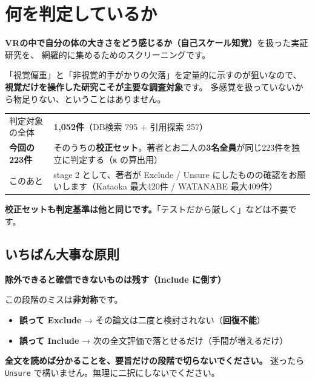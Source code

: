 \documentclass[a4paper]{ltjsarticle}
\newcommand{\keybox}[1]{%
  \par\medskip
  \noindent\colorbox{soft}{%
    \begin{minipage}{\dimexpr\linewidth-2\fboxsep\relax}
      \vspace{2pt}\centering\bfseries\large #1\vspace{4pt}
    \end{minipage}}%
  \par\medskip}
\newcommand{\rsn}[1]{\texttt{\small #1}}
\begin{document}
\section{何を判定しているか}

\textbf{VRの中で自分の体の大きさをどう感じるか（自己スケール知覚）}を扱った実証研究を、
網羅的に集めるためのスクリーニングです。

\medskip
\noindent
「視覚偏重」と「非視覚的手がかりの欠落」を定量的に示すのが狙いなので、
\textbf{視覚だけを操作した研究こそが主要な調査対象}です。
多感覚を扱っていないから物足りない、ということはありません。

\begin{center}
\begin{tabularx}{\linewidth}{L{8em} X}
\toprule
判定対象の全体 & \textbf{1,052件}（DB検索 795 + 引用探索 257） \\
\addlinespace
\textbf{今回の223件} & そのうちの\textbf{校正セット}。著者とお二人の\textbf{3名全員}が同じ223件を独立に判定する（κ の算出用） \\
\addlinespace
このあと & stage 2 として、著者が Exclude / Unsure にしたものの確認をお願いします（Kataoka 最大420件 / WATANABE 最大409件） \\
\bottomrule
\end{tabularx}
\end{center}

\noindent
\textbf{校正セットも判定基準は他と同じです。}「テストだから厳しく」などは不要です。

\subsection{いちばん大事な原則}

\keybox{除外できると確信できないものは残す（Include に倒す）}

\noindent
この段階のミスは\textbf{非対称}です。

\begin{itemize}
  \item \textbf{誤って Exclude} → その論文は二度と検討されない（\textbf{回復不能}）
  \item \textbf{誤って Include} → 次の全文評価で落とせるだけ（手間が増えるだけ）
\end{itemize}

\noindent
\textbf{全文を読めば分かることを、要旨だけの段階で切らないでください。}
迷ったら \rsn{Unsure} で構いません。無理に二択にしないでください。
\end{document}

